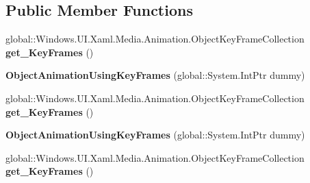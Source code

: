 \subsection*{Public Member Functions}
\begin{DoxyCompactItemize}
\item 
\mbox{\label{class_windows_1_1_u_i_1_1_xaml_1_1_media_1_1_animation_1_1_object_animation_using_key_frames_aba52657d062ddf9fbb4f6ee5cc3641af}} 
global\+::\+Windows.\+U\+I.\+Xaml.\+Media.\+Animation.\+Object\+Key\+Frame\+Collection {\bfseries get\+\_\+\+Key\+Frames} ()
\item 
\mbox{\label{class_windows_1_1_u_i_1_1_xaml_1_1_media_1_1_animation_1_1_object_animation_using_key_frames_adce5270df71160bf8c1fc1a86617c436}} 
{\bfseries Object\+Animation\+Using\+Key\+Frames} (global\+::\+System.\+Int\+Ptr dummy)
\item 
\mbox{\label{class_windows_1_1_u_i_1_1_xaml_1_1_media_1_1_animation_1_1_object_animation_using_key_frames_aba52657d062ddf9fbb4f6ee5cc3641af}} 
global\+::\+Windows.\+U\+I.\+Xaml.\+Media.\+Animation.\+Object\+Key\+Frame\+Collection {\bfseries get\+\_\+\+Key\+Frames} ()
\item 
\mbox{\label{class_windows_1_1_u_i_1_1_xaml_1_1_media_1_1_animation_1_1_object_animation_using_key_frames_adce5270df71160bf8c1fc1a86617c436}} 
{\bfseries Object\+Animation\+Using\+Key\+Frames} (global\+::\+System.\+Int\+Ptr dummy)
\item 
\mbox{\label{class_windows_1_1_u_i_1_1_xaml_1_1_media_1_1_animation_1_1_object_animation_using_key_frames_aba52657d062ddf9fbb4f6ee5cc3641af}} 
global\+::\+Windows.\+U\+I.\+Xaml.\+Media.\+Animation.\+Object\+Key\+Frame\+Collection {\bfseries get\+\_\+\+Key\+Frames} ()
\item 
\mbox{\label{class_windows_1_1_u_i_1_1_xaml_1_1_media_1_1_animation_1_1_object_animation_using_key_frames_adce5270df71160bf8c1fc1a86617c436}} 

\end{DoxyCompactItemize}
